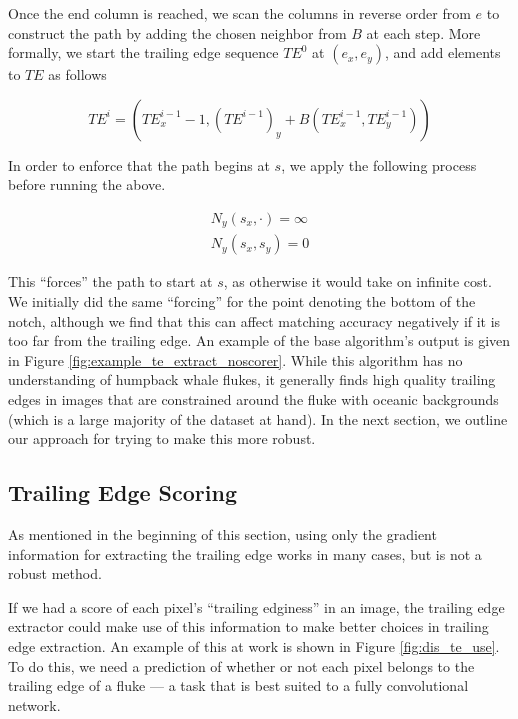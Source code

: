 Once the end column is reached, we scan the columns in reverse order from $e$ to construct the path by adding the chosen neighbor from $B$ at each step.
More formally, we start the trailing edge sequence $TE^0$ at $(e_x, e_y)$, and add elements to $TE$ as follows

\begin{equation} \label{eqn:te_build}
	TE^i = (TE^{i-1}_x - 1, (TE^{i-1})_y + B(TE^{i-1}_x,TE^{i-1}_y))
\end{equation}

In order to enforce that the path begins at $s$, we apply the following process before running the above.

\begin{align} \label{eqn:te_setup}
N_y(s_x,\cdot) = \infty \\
N_y(s_x,s_y) = 0
\end{align}

This ``forces'' the path to start at $s$, as otherwise it would take on infinite cost.
We initially did the same ``forcing'' for the point denoting the bottom of the notch, although we find that this can affect matching accuracy negatively if it is too far from the trailing edge.
An example of the base algorithm's output is given in Figure \ref{fig:example_te_extract_noscorer}.
While this algorithm has no understanding of humpback whale flukes, it generally finds high quality trailing edges in images that are constrained around the fluke with oceanic backgrounds (which is a large majority of the dataset at hand).
In the next section, we outline our approach for trying to make this more robust.


\subsection{Trailing Edge Scoring}

As mentioned in the beginning of this section, using only the gradient information for extracting the trailing edge works in many cases, but is not a robust method.

If we had a score of each pixel's ``trailing edginess'' in an image, the trailing edge extractor could make use of this information to make better choices in trailing edge extraction.
An example of this at work is shown in Figure \ref{fig:dis_te_use}.
To do this, we need a prediction of whether or not each pixel belongs to the trailing edge of a fluke --- a task that is best suited to a fully convolutional network.

